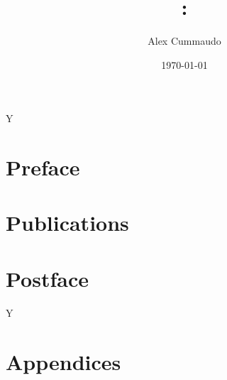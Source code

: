 \documentclass[twoside,11pt,titlepage]{book}
\title{\thesubtitle: \themaintitle}
\author{Alex Cummaudo}
\date{\today}
\def\review{Y}
\begin{document}
\frontmatter







\mainmatter

\ifdefined\review\begin{linenumbers}\else\fi

\part{Preface}




\part{Publications}



\part{Postface}



\ifdefined\review\end{linenumbers}\else\fi

\appendix

\part{Appendices}




\end{document}
